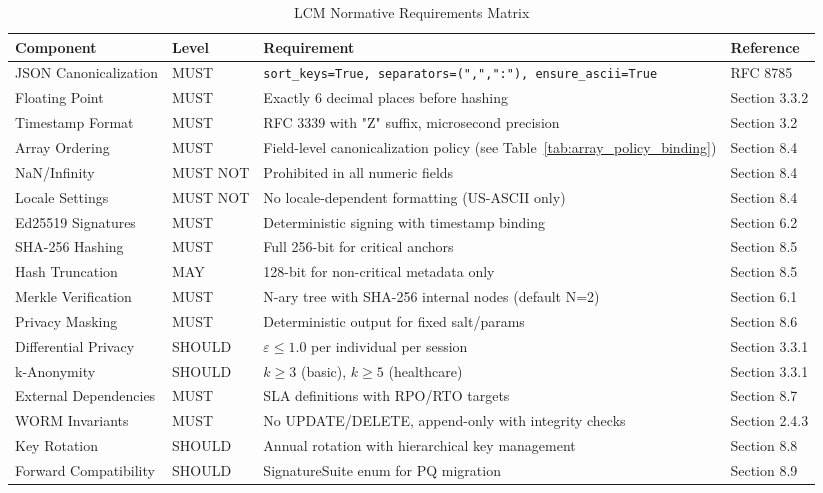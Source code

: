 \documentclass[12pt,a4paper]{article}
\begin{document}
\begin{table}[H]
\centering
\scriptsize
\begin{tabular}{p{3cm}p{2cm}p{6cm}p{2cm}}
\toprule
\textbf{Component} & \textbf{Level} & \textbf{Requirement} & \textbf{Reference} \\
\midrule
JSON Canonicalization & MUST & \texttt{sort\_keys=True, separators=(",",":"), ensure\_ascii=True} & RFC 8785 \\
Floating Point & MUST & Exactly 6 decimal places before hashing & Section 3.3.2 \\
Timestamp Format & MUST & RFC 3339 with "Z" suffix, microsecond precision & Section 3.2 \\
Array Ordering & MUST & Field-level canonicalization policy (see Table~\ref{tab:array_policy_binding}) & Section 8.4 \\
NaN/Infinity & MUST NOT & Prohibited in all numeric fields & Section 8.4 \\
Locale Settings & MUST NOT & No locale-dependent formatting (US-ASCII only) & Section 8.4 \\
\midrule
Ed25519 Signatures & MUST & Deterministic signing with timestamp binding & Section 6.2 \\
SHA-256 Hashing & MUST & Full 256-bit for critical anchors & Section 8.5 \\
Hash Truncation & MAY & 128-bit for non-critical metadata only & Section 8.5 \\
Merkle Verification & MUST & N-ary tree with SHA-256 internal nodes (default N=2) & Section 6.1 \\
\midrule
Privacy Masking & MUST & Deterministic output for fixed salt/params & Section 8.6 \\
Differential Privacy & SHOULD & $\varepsilon \leq 1.0$ per individual per session & Section 3.3.1 \\
k-Anonymity & SHOULD & $k \geq 3$ (basic), $k \geq 5$ (healthcare) & Section 3.3.1 \\
External Dependencies & MUST & SLA definitions with RPO/RTO targets & Section 8.7 \\
\midrule
WORM Invariants & MUST & No UPDATE/DELETE, append-only with integrity checks & Section 2.4.3 \\
Key Rotation & SHOULD & Annual rotation with hierarchical key management & Section 8.8 \\
Forward Compatibility & SHOULD & SignatureSuite enum for PQ migration & Section 8.9 \\
\bottomrule
\end{tabular}
\caption{LCM Normative Requirements Matrix}
\label{tab:normative}
\end{table}
\end{document}
